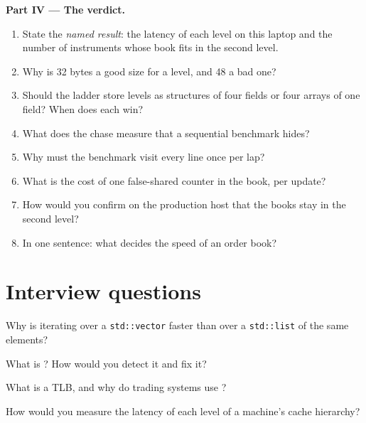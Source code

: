 \begin{problem}
\medskip\noindent\textbf{Part IV --- The verdict.}
\begin{enumerate}[resume]
\item State the \emph{named result}: the latency of each level on this laptop and the number of instruments whose book
fits in the second level.
\item Why is 32 bytes a good size for a level, and 48 a bad one?
\item Should the ladder store levels as structures of four fields or four arrays of one field? When does each win?
\item What does the chase measure that a sequential benchmark hides?
\item Why must the benchmark visit every line once per lap?
\item What is the cost of one false-shared counter in the book, per update?
\item How would you confirm on the production host that the books stay in the second level?
\item In one sentence: what decides the speed of an order book?
\end{enumerate}
\end{problem}

\section{Interview questions}

\begin{interviewq}\label{iq:ll:memory-hierarchy-and-caches:1}
Why is iterating over a \texttt{std::vector} faster than over a \texttt{std::list} of the same elements?
\end{interviewq}

\begin{interviewq}\label{iq:ll:memory-hierarchy-and-caches:2}
What is ? How would you detect it and fix it?
\end{interviewq}

\begin{interviewq}\label{iq:ll:memory-hierarchy-and-caches:3}
What is a TLB, and why do trading systems use ?
\end{interviewq}

\begin{interviewq}\label{iq:ll:memory-hierarchy-and-caches:4}
How would you measure the latency of each level of a machine's cache hierarchy?
\end{interviewq}

